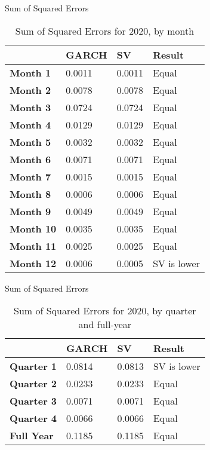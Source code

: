 \documentclass[11pt]{beamer}
\begin{document}
\begin{frame}{Sum of Squared Errors}
\begin{table}[!ht]
    \centering
    \begin{tabular}{|l|l|l|l|}
    \hline
        ~ & \textbf{GARCH} & \textbf{SV} & \textbf{Result} \\ \hline
        \textbf{Month 1} & 0.0011 & 0.0011 & Equal \\ \hline
        \textbf{Month 2} & 0.0078 & 0.0078 & Equal \\ \hline
        \textbf{Month 3} & 0.0724 & 0.0724 & Equal \\ \hline
        \textbf{Month 4} & 0.0129 & 0.0129 & Equal \\ \hline
        \textbf{Month 5} & 0.0032 & 0.0032 & Equal \\ \hline
        \textbf{Month 6} & 0.0071 & 0.0071 & Equal \\ \hline
        \textbf{Month 7} & 0.0015 & 0.0015 & Equal \\ \hline
        \textbf{Month 8} & 0.0006 & 0.0006 & Equal \\ \hline
        \textbf{Month 9} & 0.0049 & 0.0049 & Equal \\ \hline
        \textbf{Month 10} & 0.0035 & 0.0035 & Equal \\ \hline
        \textbf{Month 11} & 0.0025 & 0.0025 & Equal \\ \hline
        \textbf{Month 12} & 0.0006 & 0.0005 & SV is lower \\ \hline
    \end{tabular}
\caption{Sum of Squared Errors for 2020, by month}
\end{table}

\end{frame}


\begin{frame}{Sum of Squared Errors}
\begin{table}[!ht]
    \centering
    \begin{tabular}{|l|l|l|l|}
    \hline
        ~ & \textbf{GARCH} & \textbf{SV} & \textbf{Result} \\ \hline
           \textbf{Quarter 1} & 0.0814 & 0.0813 & SV is lower \\ \hline
        \textbf{Quarter 2} & 0.0233 & 0.0233 & Equal \\ \hline
        \textbf{Quarter 3} & 0.0071 & 0.0071 & Equal \\ \hline
        \textbf{Quarter 4} & 0.0066 & 0.0066 & Equal \\ \hline
        \textbf{Full Year} & 0.1185 & 0.1185 & Equal \\ \hline
    \end{tabular}
\caption{Sum of Squared Errors for 2020, by quarter and full-year}
\end{table}
\end{frame}
\end{document}
